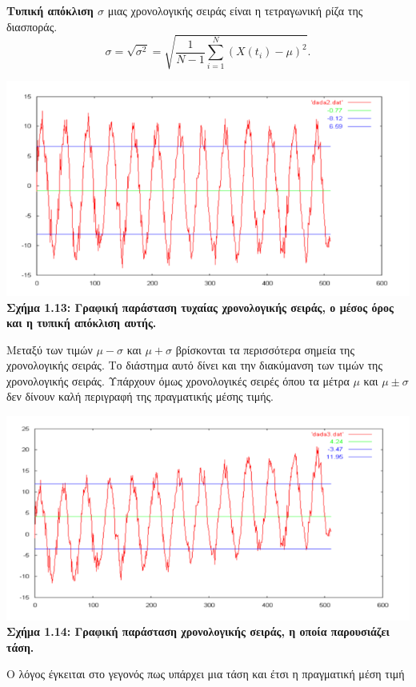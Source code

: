 \textbf{ Τυπική απόκλιση $ \sigma$} μιας χρονολογικής σειράς είναι η τετραγωνική ρίζα της
διασποράς.\\
$$ \sigma=\sqrt{\sigma^2}=\sqrt{\frac{1}{N-1}\sum_{i=1}^{N} \left(X\left(t_i\right)-\mu\right)^2}. $$
\begin{center}
\includegraphics[scale=0.5]{graf10.png}\\
\textbf{Σχήμα 1.13: Γραφική παράσταση τυχαίας χρονολογικής σειράς, ο μέσος όρος και η τυπική
απόκλιση αυτής.}
\end{center}
Μεταξύ των τιμών $ \mu-\sigma$ και $\mu+\sigma$
βρίσκονται τα περισσότερα σημεία της
χρονολογικής σειράς. Το διάστημα αυτό δίνει και την διακύμανση των τιμών της
χρονολογικής σειράς. Υπάρχουν όμως χρονολογικές σειρές όπου τα μέτρα $ \mu$ και $ \mu\pm\sigma$
δεν δίνουν καλή περιγραφή της πραγματικής μέσης τιμής.\\
\begin{center}
\includegraphics[scale=0.5]{graf11.png}\\
\textbf{Σχήμα 1.14: Γραφική παράσταση χρονολογικής σειράς, η οποία παρουσιάζει τάση.}
\end{center}
Ο λόγος έγκειται στο γεγονός πως υπάρχει μια τάση και έτσι η πραγματική μέση τιμή

